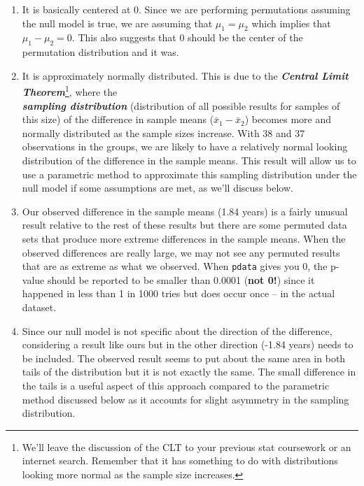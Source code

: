 \documentclass[]{book}
\let\rmarkdownfootnote\footnote%
\def\footnote{\protect\rmarkdownfootnote}
\begin{document}
\begin{enumerate}
\def\labelenumi{\arabic{enumi}.}
\item
  It is basically centered at 0. Since we are performing permutations
  assuming the null model is true, we are assuming that
  \(\mu_1 = \mu_2\) which implies that \(\mu_1 - \mu_2 = 0\). This also
  suggests that 0 should be the center of the permutation distribution
  and it was.
\item
  It is approximately normally distributed. This is due to the
  \textbf{\emph{Central Limit Theorem}}\footnote{We'll leave the
    discussion of the CLT to your previous stat coursework or an
    internet search. Remember that it has something to do with
    distributions looking more normal as the sample size increases.},
  where the\\
  \textbf{\emph{sampling distribution}} (distribution of all possible
  results for samples of this size) of the difference in sample means
  (\(\bar{x}_1 - \bar{x}_2\)) becomes more and normally distributed as
  the sample sizes increase. With 38 and 37 observations in the groups,
  we are likely to have a relatively normal looking distribution of the
  difference in the sample means. This result will allow us to use a
  parametric method to approximate this sampling distribution under the
  null model if some assumptions are met, as we'll discuss below.
\item
  Our observed difference in the sample means (1.84 years) is a fairly
  unusual result relative to the rest of these results but there are
  some permuted data sets that produce more extreme differences in the
  sample means. When the observed differences are really large, we may
  not see any permuted results that are as extreme as what we observed.
  When \texttt{pdata} gives you 0, the p-value should be reported to be
  smaller than 0.0001 (\textbf{not 0!}) since it happened in less than 1
  in 1000 tries but does occur once -- in the actual dataset.
\item
  Since our null model is not specific about the direction of the
  difference, considering a result like ours but in the other direction
  (-1.84 years) needs to be included. The observed result seems to put
  about the same area in both tails of the distribution but it is not
  exactly the same. The small difference in the tails is a useful aspect
  of this approach compared to the parametric method discussed below as
  it accounts for slight asymmetry in the sampling distribution.
\end{enumerate}
\end{document}
